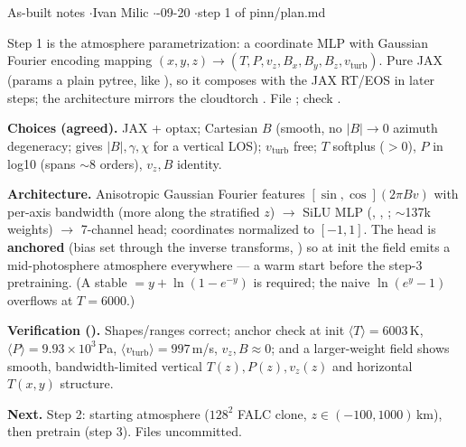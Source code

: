 


%
{As-built notes \quad$\cdot$\quad Ivan Milic \quad$\cdot$-09-20 \quad$\cdot$\quad step 1 of pinn/plan.md}

Step 1 is the atmosphere parametrization: a coordinate MLP with Gaussian Fourier encoding mapping
$(x,y,z)\to(T,P,v_z,B_x,B_y,B_z,v_\mathrm{turb})$. Pure JAX (params a plain pytree, like
), so it composes with the JAX RT/EOS in later steps; the architecture mirrors
the cloudtorch . File ; check .

\textbf{Choices (agreed).} JAX + optax; Cartesian $B$ (smooth, no $|B|\!\to\!0$ azimuth degeneracy;
 gives $|B|,\gamma,\chi$ for a vertical LOS); $v_\mathrm{turb}$ free; $T$ softplus
($>0$), $P$ in log10 (spans $\sim$8 orders), $v_z,B$ identity.

\textbf{Architecture.} Anisotropic Gaussian Fourier features $[\sin,\cos](2\pi Bv)$ with per-axis bandwidth
 (more along the stratified $z$) $\to$ SiLU MLP (, ,
; $\sim$137k weights) $\to$ 7-channel head; coordinates normalized to $[-1,1]$. The head is
\textbf{anchored} (bias set through the inverse transforms, ) so at init the field emits a
mid-photosphere atmosphere everywhere --- a warm start before the step-3 pretraining. (A stable
$=y+\ln(1-e^{-y})$ is required; the naive $\ln(e^{y}-1)$ overflows at $T=6000$.)

\textbf{Verification ().} Shapes/ranges correct; anchor check at init
$\langle T\rangle{=}6003$\,K, $\langle P\rangle{=}9.93{\times}10^{3}$\,Pa, $\langle v_\mathrm{turb}\rangle{=}997$\,m/s,
$v_z,B\!\approx\!0$; and a larger-weight field shows smooth, bandwidth-limited vertical $T(z),P(z),v_z(z)$ and
horizontal $T(x,y)$ structure.

\textbf{Next.} Step 2: starting atmosphere ($128^2$ FALC clone, $z\in(-100,1000)$\,km), then pretrain (step 3).
Files uncommitted.


